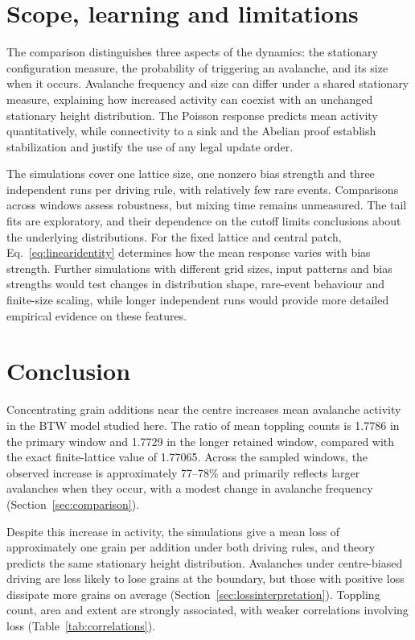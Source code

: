 \documentclass[11pt,a4paper,oneside]{report}
\numberwithin{equation}{chapter}
\begin{document}
\section{Scope, learning and limitations}
The comparison distinguishes three aspects of the dynamics: the stationary configuration measure, the probability of triggering an avalanche, and its size when it occurs. Avalanche frequency and size can differ under a shared stationary measure, explaining how increased activity can coexist with an unchanged stationary height distribution. The Poisson response predicts mean activity quantitatively, while connectivity to a sink and the Abelian proof establish stabilization and justify the use of any legal update order.

The simulations cover one lattice size, one nonzero bias strength and three independent runs per driving rule, with relatively few rare events. Comparisons across windows assess robustness, but mixing time remains unmeasured. The tail fits are exploratory, and their dependence on the cutoff limits conclusions about the underlying distributions. For the fixed lattice and central patch, Eq.~\eqref{eq:linearidentity} determines how the mean response varies with bias strength. Further simulations with different grid sizes, input patterns and bias strengths would test changes in distribution shape, rare-event behaviour and finite-size scaling, while longer independent runs would provide more detailed empirical evidence on these features.

\section{Conclusion}
Concentrating grain additions near the centre increases mean avalanche activity in the BTW model studied here. The ratio of mean toppling counts is 1.7786 in the primary window and 1.7729 in the longer retained window, compared with the exact finite-lattice value of 1.77065. Across the sampled windows, the observed increase is approximately 77--78\% and primarily reflects larger avalanches when they occur, with a modest change in avalanche frequency (Section~\ref{sec:comparison}).

Despite this increase in activity, the simulations give a mean loss of approximately one grain per addition under both driving rules, and theory predicts the same stationary height distribution. Avalanches under centre-biased driving are less likely to lose grains at the boundary, but those with positive loss dissipate more grains on average (Section~\ref{sec:lossinterpretation}). Toppling count, area and extent are strongly associated, with weaker correlations involving loss (Table~\ref{tab:correlations}).
\end{document}
